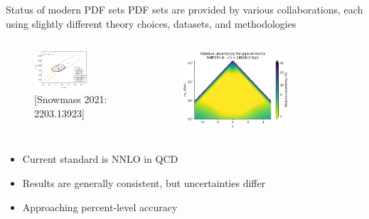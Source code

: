 \documentclass[aspectratio=169, 8pt,t]{beamer}
\begin{document}
\begin{frame}{Status of modern PDF sets}
  PDF sets are provided by various collaborations, each using slightly different theory choices, datasets, and methodologies
  \begin{columns}
    \begin{column}{0.49\textwidth}
      \begin{figure}
        \includegraphics[width=0.7\textwidth]{Httbar_xsec}
        \caption*{\color{gray}\small \footnotesize [Snowmass 2021: 2203.13923]}
      \end{figure}
    \end{column}
    \begin{column}{0.49\textwidth}
      \begin{figure}
        \includegraphics[width=0.7\textwidth]{gqlumi}
      \end{figure}
    \end{column}
  \end{columns}
  \begin{itemize}
    \item Current standard is NNLO in QCD
    \item Results are generally consistent, but uncertainties differ
    \item Approaching percent-level accuracy
  \end{itemize}
\end{frame}
\end{document}

